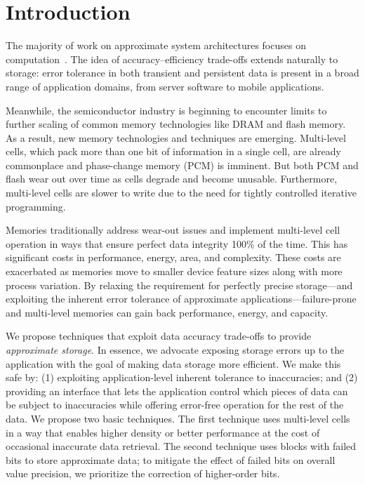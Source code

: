 

\section{Introduction}
\label{approxstorage:sec:intro}

The majority of work on approximate system architectures focuses on
computation~\cite{enerj,truffle,pcmos,stochasticproc,relax,ersa}.
The idea of accuracy--efficiency trade-offs extends naturally to
storage: error tolerance in both transient and persistent data is
present in a broad range of application domains, from server software to
mobile applications.

Meanwhile, the semiconductor industry is beginning to encounter limits to
further scaling of common memory technologies like DRAM and flash memory. As a
result, new memory technologies and techniques are emerging. Multi-level cells,
which pack more than one bit of information in a single cell,
are already commonplace and phase-change memory (PCM) is imminent.
But both
PCM and flash wear out over time as cells degrade and become unusable. Furthermore, multi-level cells
are slower to write due to the need for tightly
controlled iterative programming.

Memories traditionally address wear-out issues and implement multi-level cell
operation in ways that ensure perfect data integrity 100\% of the time. This
has significant costs in performance, energy, area, and complexity. These
costs are exacerbated as memories move to smaller device feature sizes along
with more process variation. By relaxing the requirement for perfectly precise
storage---and exploiting the inherent error tolerance of approximate
applications---failure-prone and multi-level memories can gain back
performance, energy, and capacity.

We propose techniques that exploit data accuracy trade-offs to
provide \emph{approximate storage}. In essence, we advocate exposing storage
errors up to the application with the goal of making data storage more
efficient. We make this safe by: (1) exploiting application-level inherent
tolerance to inaccuracies; and (2) providing an interface that lets the
application control which pieces of data can be subject to inaccuracies while offering error-free operation for the rest of the data.
We propose two basic techniques. The first
technique uses multi-level cells in a way that enables higher density or
better performance at the cost of occasional inaccurate data retrieval. The
second technique uses blocks with failed bits to store approximate data; to
mitigate the effect of failed bits on overall value precision, we prioritize
the correction of higher-order bits.

